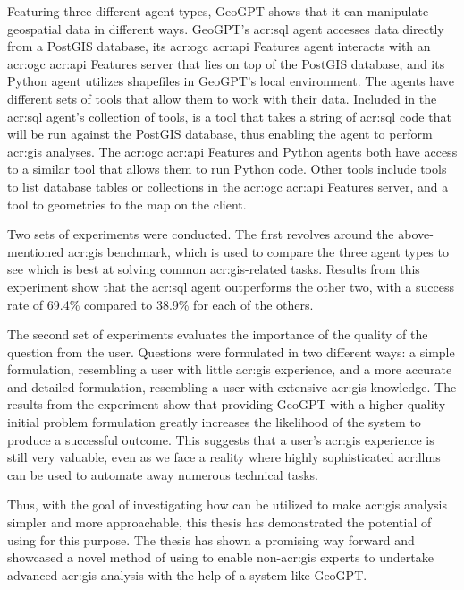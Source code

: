 Featuring three different agent types, GeoGPT shows that it can manipulate geospatial data in different ways. GeoGPT's \acrshort{acr:sql} agent accesses data directly from a PostGIS database, its \acrshort{acr:ogc} \acrshort{acr:api} Features agent interacts with an \acrshort{acr:ogc} \acrshort{acr:api} Features server that lies on top of the PostGIS database, and its Python agent utilizes shapefiles in GeoGPT's local environment. The agents have different sets of tools that allow them to work with their data. Included in the \acrshort{acr:sql} agent's collection of tools, is a tool that takes a string of \acrshort{acr:sql} code that will be run against the PostGIS database, thus enabling the agent to perform \acrshort{acr:gis} analyses. The \acrshort{acr:ogc} \acrshort{acr:api} Features and Python agents both have access to a similar tool that allows them to run Python code. Other tools include tools to list database tables or collections in the \acrshort{acr:ogc} \acrshort{acr:api} Features server, and a tool to geometries to the map on the client.


Two sets of experiments were conducted. The first revolves around the above-mentioned \acrshort{acr:gis} benchmark, which is used to compare the three agent types to see which is best at solving common \acrshort{acr:gis}-related tasks. Results from this experiment show that the \acrshort{acr:sql} agent outperforms the other two, with a success rate of 69.4\% compared to 38.9\% for each of the others.

The second set of experiments evaluates the importance of the quality of the question from the user. Questions were formulated in two different ways: a simple formulation, resembling a user with little \acrshort{acr:gis} experience, and a more accurate and detailed formulation, resembling a user with extensive \acrshort{acr:gis} knowledge. The results from the experiment show that providing GeoGPT with a higher quality initial problem formulation greatly increases the likelihood of the system to produce a successful outcome. This suggests that a user's \acrshort{acr:gis} experience is still very valuable, even as we face a reality where highly sophisticated \glspl{acr:llm} can be used to automate away numerous technical tasks.

Thus, with the goal of investigating how  can be utilized to make \acrshort{acr:gis} analysis simpler and more approachable, this thesis has demonstrated the potential of using  for this purpose. The thesis has shown a promising way forward and showcased a novel method of using  to enable non-\acrshort{acr:gis} experts to undertake advanced \acrshort{acr:gis} analysis with the help of a system like GeoGPT.
